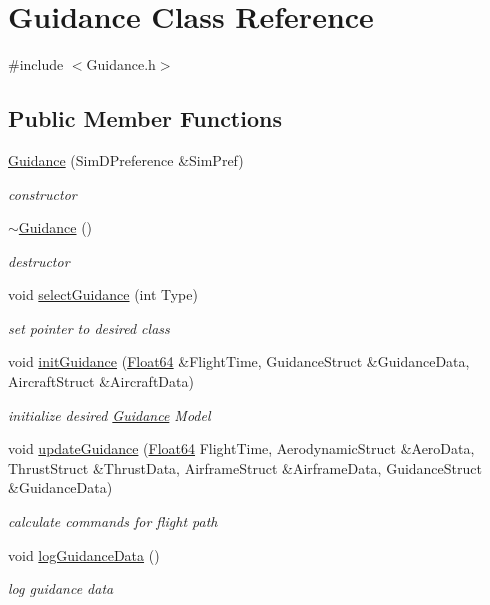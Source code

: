 \hypertarget{class_guidance}{}\section{Guidance Class Reference}
\label{class_guidance}


{\ttfamily \#include $<$Guidance.\+h$>$}

\subsection*{Public Member Functions}
\begin{DoxyCompactItemize}
\item 
\hyperlink{class_guidance_a8703d25e590e6f8aa308780200ba091a}{Guidance} (Sim\+D\+Preference \&Sim\+Pref)
\begin{DoxyCompactList}\small\item\em constructor \end{DoxyCompactList}\item 
\hyperlink{class_guidance_ad14ccf81d6a06ec9333d921c7b8f2927}{$\sim$\+Guidance} ()
\begin{DoxyCompactList}\small\item\em destructor \end{DoxyCompactList}\item 
void \hyperlink{class_guidance_af38a54211f890c38b8dcc99f2f2d5f32}{select\+Guidance} (int Type)
\begin{DoxyCompactList}\small\item\em set pointer to desired class \end{DoxyCompactList}\item 
void \hyperlink{class_guidance_af35696b8418ec88006136ba886468d8e}{init\+Guidance} (\hyperlink{group___tools_ga3f1431cb9f76da10f59246d1d743dc2c}{Float64} \&Flight\+Time, Guidance\+Struct \&Guidance\+Data, Aircraft\+Struct \&Aircraft\+Data)
\begin{DoxyCompactList}\small\item\em initialize desired \hyperlink{class_guidance}{Guidance} Model \end{DoxyCompactList}\item 
void \hyperlink{class_guidance_a63f50ab91a4661b7d5d4927e6deb14ff}{update\+Guidance} (\hyperlink{group___tools_ga3f1431cb9f76da10f59246d1d743dc2c}{Float64} Flight\+Time, Aerodynamic\+Struct \&Aero\+Data, Thrust\+Struct \&Thrust\+Data, Airframe\+Struct \&Airframe\+Data, Guidance\+Struct \&Guidance\+Data)
\begin{DoxyCompactList}\small\item\em calculate commands for flight path \end{DoxyCompactList}\item 
void \hyperlink{class_guidance_aabd9f3dceafe3021397f055ede561bcb}{log\+Guidance\+Data} ()
\begin{DoxyCompactList}\small\item\em log guidance data \end{DoxyCompactList}\end{DoxyCompactItemize}


